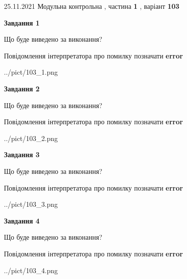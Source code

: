 \documentclass[10pt, ukrainian]{article}
\begin{document}
{25.11.2021 Модульна контрольна , частина \textbf { 1 }, варіант  \No \textbf { 103 }\par}
{
\begin {large}

{\begin {center}\textbf{Завдання 1}\end {center}}\par
Що буде виведено за виконання? \par
Повідомлення інтерпретатора про помилку позначати \textbf{error}

\begin{center}
	{../pict/103_1.png}
\end{center}
\newpage

{\begin {center}\textbf{Завдання 2}\end {center}}\par
Що буде виведено за виконання? \par
Повідомлення інтерпретатора про помилку позначати \textbf{error}

\begin{center}
	{../pict/103_2.png}
\end{center}
\newpage

{\begin {center}\textbf{Завдання 3}\end {center}}\par
Що буде виведено за виконання? \par
Повідомлення інтерпретатора про помилку позначати \textbf{error}

\begin{center}
	{../pict/103_3.png}
\end{center}
\newpage

{\begin {center}\textbf{Завдання 4}\end {center}}\par
Що буде виведено за виконання? \par
Повідомлення інтерпретатора про помилку позначати \textbf{error}

\begin{center}
	{../pict/103_4.png}
\end{center}
\newpage


\end{large}}
\end{document}
